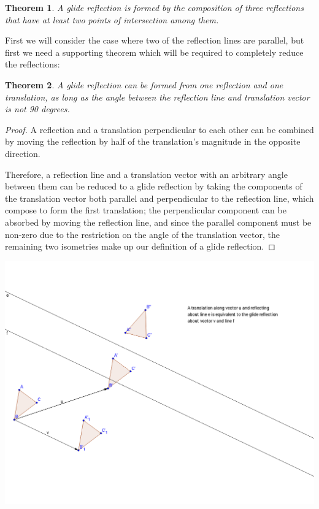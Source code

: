 \documentclass[11pt]{article}
\newtheorem{theorem}{Theorem}[section]
\theoremstyle{definition}
\begin{document}
\begin{theorem}\label{3 reflections form a glide reflection}
  A glide reflection is formed by the composition of three reflections that
  have at least two points of intersection among them.
\end{theorem}

First we will consider the case where two of the reflection lines are parallel,
but first we need a supporting theorem which will be required to completely
reduce the reflections:

\begin{theorem}\label{glide reflection from a reflection and a translation}
  A glide reflection can be formed from one reflection and one translation,
  as long as the angle between the reflection line and translation vector is
  not 90 degrees.
\end{theorem}

\begin{proof}
  A reflection and a translation perpendicular to each other can be combined by
  moving the reflection by half of the translation's magnitude in the opposite
  direction.

  Therefore, a reflection line and a translation vector with an arbitrary angle
  between them can be reduced to a glide reflection by taking the components of
  the translation vector both parallel and perpendicular to the reflection
  line, which compose to form the first translation; the perpendicular
  component can be absorbed by moving the reflection line, and since the
  parallel component must be non-zero due to the restriction on the angle of
  the translation vector, the remaining two isometries make up our definition
  of a glide reflection.
\end{proof}

\includegraphics[scale=.4]{glide}
\end{document}
